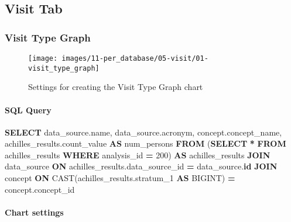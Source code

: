 \documentclass[
]{book}
\newenvironment{Shaded}{\begin{snugshade}}{\end{snugshade}}
\newcommand{\DecValTok}[1]{\textcolor[rgb]{0.00,0.00,0.81}{#1}}
\newcommand{\FunctionTok}[1]{\textcolor[rgb]{0.00,0.00,0.00}{#1}}
\newcommand{\KeywordTok}[1]{\textcolor[rgb]{0.13,0.29,0.53}{\textbf{#1}}}
\newcommand{\NormalTok}[1]{#1}
\newcommand{\OperatorTok}[1]{\textcolor[rgb]{0.81,0.36,0.00}{\textbf{#1}}}
\begin{document}
\hypertarget{visit-tab}{%
\subsection*{Visit Tab}\label{visit-tab}}

\hypertarget{visit-type-graph}{%
\subsubsection*{Visit Type Graph}\label{visit-type-graph}}

\begin{figure}
\texttt{[image: images/11-per\_database/05-visit/01-visit\_type\_graph]} \caption{Settings for creating the Visit Type Graph chart}\label{fig:visitTypeGraph}
\end{figure}

\hypertarget{sql-query-32}{%
\paragraph*{SQL Query}\label{sql-query-32}}

\begin{Shaded}
\begin{Highlighting}[]
\KeywordTok{SELECT}
\NormalTok{  data\_source.name,}
\NormalTok{  data\_source.acronym,}
\NormalTok{  concept.concept\_name,}
\NormalTok{  achilles\_results.count\_value }\KeywordTok{AS}\NormalTok{ num\_persons}
\KeywordTok{FROM}\NormalTok{ (}\KeywordTok{SELECT} \OperatorTok{*} \KeywordTok{FROM}\NormalTok{ achilles\_results }\KeywordTok{WHERE}\NormalTok{ analysis\_id }\OperatorTok{=} \DecValTok{200}\NormalTok{) }\KeywordTok{AS}\NormalTok{ achilles\_results}
\KeywordTok{JOIN}\NormalTok{ data\_source }\KeywordTok{ON}\NormalTok{ achilles\_results.data\_source\_id }\OperatorTok{=}\NormalTok{ data\_source.}\KeywordTok{id}
\KeywordTok{JOIN}\NormalTok{ concept }\KeywordTok{ON} \FunctionTok{CAST}\NormalTok{(achilles\_results.stratum\_1 }\KeywordTok{AS}\NormalTok{ BIGINT) }\OperatorTok{=}\NormalTok{ concept.concept\_id}
\end{Highlighting}
\end{Shaded}

\hypertarget{chart-settings-35}{%
\paragraph*{Chart settings}\label{chart-settings-35}}
\end{document}
